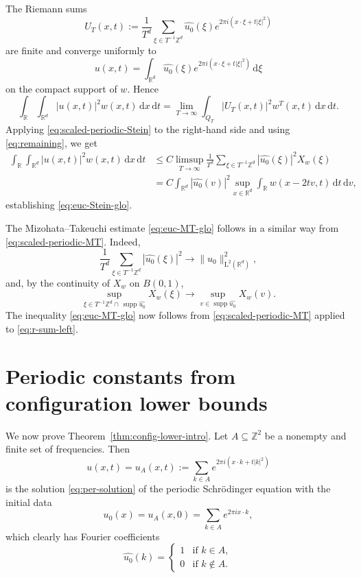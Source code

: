 \documentclass[11pt,reqno]{amsart}
\numberwithin{equation}{section}
\newcommand{\supp}{\operatorname{supp}}
\newcommand{\dd}{\,\mathrm{d}}
\renewcommand{\leq}{\leqslant}
\begin{document}
The Riemann sums
\[ U_T(x,t):=\frac{1}{T^d}\sum_{\xi\in T^{-1}\mathbb{Z}^d}\widehat{u_0}(\xi)e^{2\pi i(x\cdot\xi+t|\xi|^2)} \]
are finite and converge uniformly to
\[ u(x,t)=\int_{\mathbb{R}^d}\widehat{u_0}(\xi)e^{2\pi i(x\cdot\xi+t|\xi|^2)}\dd\xi \]
on the compact support of $w$. Hence
\begin{equation}\label{eq:r-sum-left}
\int_{\mathbb{R}}\int_{\mathbb{R}^d}|u(x,t)|^2w(x,t)\dd x\dd t
=\lim_{T\to\infty}\int_{Q_T}|U_T(x,t)|^2w^T(x,t)\dd x\dd t.
\end{equation}
Applying \eqref{eq:scaled-periodic-Stein} to the right-hand side and using \eqref{eq:remaining}, we get
\begin{align*}
\int_{\mathbb{R}}\int_{\mathbb{R}^d}|u(x,t)|^2w(x,t)\dd x\dd t
&\leq C\limsup_{T\to\infty}\frac{1}{T^d}\sum_{\xi\in T^{-1}\mathbb{Z}^d}|\widehat{u_0}(\xi)|^2X_w(\xi)\\
&= C\int_{\mathbb{R}^d}|\widehat{u_0}(v)|^2\sup_{x\in\mathbb{R}^d}\int_{\mathbb{R}}w(x-2tv,t)\dd t\dd v,
\end{align*}
establishing \eqref{eq:euc-Stein-glo}.

The Mizohata--Takeuchi estimate \eqref{eq:euc-MT-glo} follows in a similar way from \eqref{eq:scaled-periodic-MT}. Indeed,
\[ \frac{1}{T^d}\sum_{\xi\in T^{-1}\mathbb{Z}^d}|\widehat{u_0}(\xi)|^2\longrightarrow \|u_0\|_{\mathrm{L}^2(\mathbb{R}^d)}^2, \]
and, by the continuity of $X_w$ on $B(0,1)$,
\[ \sup_{\xi\in T^{-1}\mathbb{Z}^d\cap\,\supp\widehat{u_0}}X_w(\xi)
\longrightarrow \sup_{v\in\supp\widehat{u_0}}X_w(v). \]
The inequality \eqref{eq:euc-MT-glo} now follows
from \eqref{eq:scaled-periodic-MT} applied to \eqref{eq:r-sum-left}.


\section{Periodic constants from configuration lower bounds}
\label{sec:config-lower}

We now prove Theorem~\ref{thm:config-lower-intro}. 
Let $A\subseteq\mathbb{Z}^2$ be a nonempty and finite set of frequencies.
Then
\[ u(x,t) = u_A(x,t) := \sum_{k\in A} e^{2\pi i(x\cdot k+t|k|^2)} \]
is the solution \eqref{eq:per-solution} of the periodic Schr\"{o}dinger equation with the initial data
\[ u_0(x) = u_A(x,0) = \sum_{k\in A} e^{2\pi i x\cdot k}, \]
which clearly has Fourier coefficients 
\[ \widehat{u_0}(k) = \begin{cases}
1 & \text{if } k\in A,\\
0 & \text{if } k\not\in A.
\end{cases} \]
\end{document}
